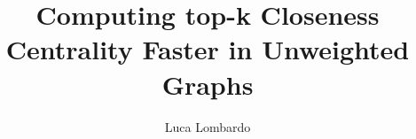 \documentclass{article}
\title{Computing top-k Closeness Centrality Faster in Unweighted Graphs}
\author{Luca Lombardo}
\date{}
\begin{document}
\maketitle

\begin{abstract}
    
\end{abstract}

\newpage
\tableofcontents{}



\end{document}
